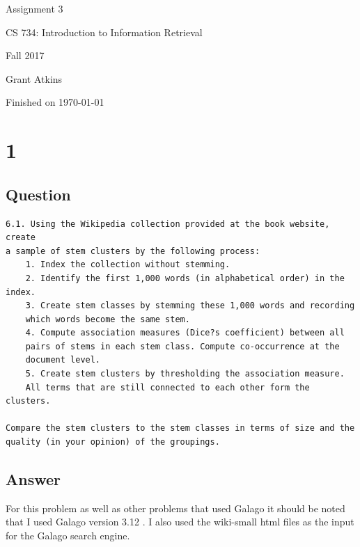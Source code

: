 \documentclass[letterpaper,11pt]{article}
\begin{document}
\begin{titlepage}

\begin{center}

\Huge{Assignment 3}

\Large{CS 734:  Introduction to Information Retrieval}

\Large{Fall 2017}

\Large{Grant Atkins}

\Large Finished on \today

\end{center}

\end{titlepage}

\newpage


\section*{1}

\subsection*{Question}

\begin{verbatim}
6.1. Using the Wikipedia collection provided at the book website, create 
a sample of stem clusters by the following process:
    1. Index the collection without stemming.
    2. Identify the first 1,000 words (in alphabetical order) in the index.
    3. Create stem classes by stemming these 1,000 words and recording 
    which words become the same stem.
    4. Compute association measures (Dice?s coefficient) between all 
    pairs of stems in each stem class. Compute co-occurrence at the 
    document level.
    5. Create stem clusters by thresholding the association measure. 
    All terms that are still connected to each other form the clusters.

Compare the stem clusters to the stem classes in terms of size and the 
quality (in your opinion) of the groupings.
\end{verbatim}

\subsection*{Answer}

For this problem as well as other problems that used Galago it should be noted that I used Galago version 3.12 \cite{galago}. 
I also used the wiki-small html files as the input for the Galago search engine.
\end{document}

